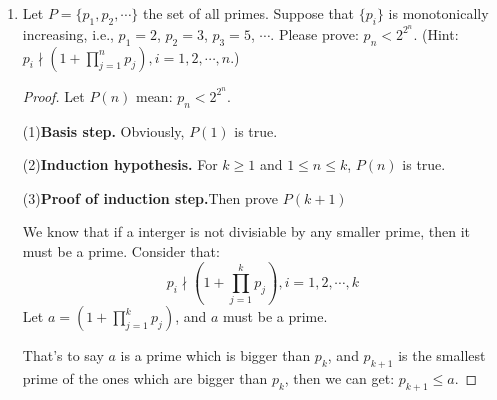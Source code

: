 \documentclass[12pt,a4paper]{article}
\theoremstyle{definition}
\begin{document}
\begin{enumerate}
\begin{proof}
        Since when $n=18=1\times4+2\times7$, $i_{18}=1$, $j_{18}=2$, we have $k\geq19$, and $(k-1)\geq18$.
        
        Since $k$ is the smalleset value among the false-values, $k-1$ should make the correspond statement right.
        Thus, $k-1=i_{k-1}\times4+j_{k-1}\times7$.
        
        
        (1) If $j_{k-1}\geq1$,Then, we can get :
        $$k=(i_{k-1}+2)\times4+(j_{k-1}-1)\times7$$Then, we can easily get:$i_k=i_{k-1}+2\geq0$ and $j_k=j_{k-1}-1\geq0$, so $n=k$ makes the statement true.
        
        (2) If $j_{k-1}<1$,which means $j_{k-1}=0$. Then, we can let  $$k=(j_{k-1}-5)\times4+(j_{k-1}+3)\times7$$   Considering that $(k-1)\geq18$ and $(k-1)$ mod $4=0$, we can get: $i_{k-1}\geq5$, because $5\times4=20>18$  while $4\times4=16<18$. Then, let:$i_k=i_{k-1}-5\geq0$ and $j_k=j_{k-1}+3\geq0$, so $n=k$ makes the statement true.
        
        To sum up, $n=k$ can always make the statement true. We have derived a contradiction, which allows us to conclude that our original assumption is false.
        
        
    \end{proof}

    \item
    Let $P=\{p_1, p_2, \cdots\}$ the set of all primes. Suppose that $\{p_i\}$ is monotonically    increasing, i.e., $p_1=2$, $p_2=3$, $p_3=5$, $\cdots$. Please prove: $p_n<2^{2^n}$. {\color{blue}(Hint: $p_i \nmid (1+\prod_{j=1}^n p_j), i=1,2,\cdots,n$.)}
   \begin{proof}
    Let $P(n)$ mean: $p_n<2^{2^n}$.
    
    (1){\bfseries Basis step.} Obviously, $P(1)$ is true.
    
    (2){\bfseries Induction hypothesis.} For $k\geq1$ and $1\leq n\leq k$,  $P(n)$ is true.
    
    (3){\bfseries Proof of induction step.}Then prove $P(k+1)$
     
     We know that if a interger is not divisiable by any smaller  prime, then it must be a prime. Consider that:$$p_i \nmid (1+\prod_{j=1}^k p_j), i=1,2,\cdots,k$$
     Let $a=(1+\prod_{j=1}^k p_j)$, and $a$ must be a prime.
     
      That's to say $a$ is a prime which is bigger than $p_k$, and $p_{k+1}$ is the smallest prime of the ones which are bigger than $p_k$, then  we can get: $p_{k+1}\leq a$.
     

\end{proof}
\end{enumerate}
\end{document}
